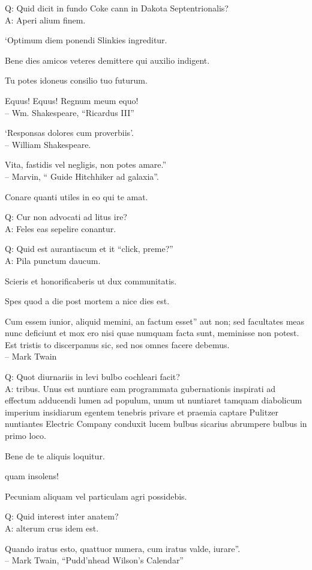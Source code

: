 \documentclass[titlepage,12pt]{memoir}
\begin{document}
Q: Quid dicit in fundo Coke cann in Dakota Septentrionalis?\\
A: Aperi alium finem.

‘Optimum diem ponendi Slinkies ingreditur.

Bene dies amicos veteres demittere qui auxilio indigent.

Tu potes idoneus consilio tuo futurum.

Equus! Equus! Regnum meum equo!
\\-- Wm. Shakespeare, “Ricardus III”

‘Responsas dolores cum proverbiis’.
\\-- William Shakespeare.

Vita, fastidis vel negligis, non potes amare.”
\\-- Marvin, “ Guide Hitchhiker ad galaxia”.

Conare quanti utiles in eo qui te amat.

Q: Cur non advocati ad litus ire?\\
A: Feles eas sepelire conantur.

Q: Quid est aurantiacum et it “click, preme?”\\
A: Pila punctum daucum.

 Scieris et honorificaberis ut dux communitatis.

Spes quod a die post mortem a nice dies est.

Cum essem iunior, aliquid memini, an factum esset”
aut non; sed facultates meas nunc deficiunt et mox ero
nisi quae numquam facta sunt, meminisse non potest. Est tristis to
discerpamus sic, sed nos omnes facere debemus.
\\-- Mark Twain

Q: Quot diurnariis in levi bulbo cochleari facit?\\
A: tribus. Unus est nuntiare eam programmata gubernationis inspirati ad effectum adducendi
lumen ad populum, unum ut nuntiaret tamquam diabolicum imperium insidiarum
egentem tenebris privare et praemia captare Pulitzer
nuntiantes Electric Company conduxit lucem bulbus sicarius abrumpere
bulbus in primo loco.

 Bene de te aliquis loquitur.

quam insolens!

 Pecuniam aliquam vel particulam agri possidebis.

Q: Quid interest inter anatem?\\
A: alterum crus idem est.

Quando iratus esto, quattuor numera, cum iratus valde, iurare”.
\\-- Mark Twain, “Pudd’nhead Wilson’s Calendar”
\end{document}
